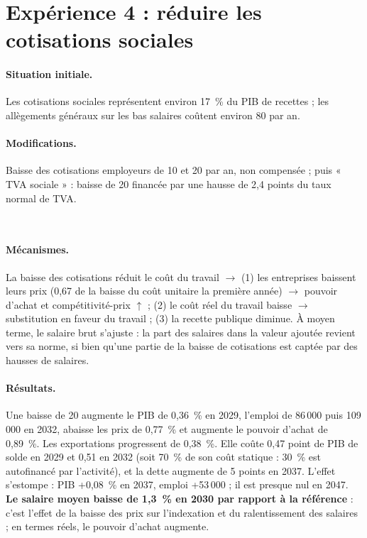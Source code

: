 \section{Expérience 4 : réduire les cotisations sociales}
\label{sec:exp4}

\paragraph{Situation initiale.} Les cotisations sociales représentent environ 17~\% du PIB de recettes ; les allègements
généraux sur les bas salaires coûtent environ 80\md{} par an.

\paragraph{Modifications.} Baisse des cotisations employeurs de 10\md{} et 20\md{} par an, non compensée ; puis
« TVA sociale » : baisse de 20\md{} financée par une hausse de 2,4 points du taux normal de TVA.

\begin{table}[htbp]
\centering\scriptsize
\caption{Expérience 4 — Baisse des cotisations employeurs.}
\label{tab:cotisations}
\\[4pt]
\end{table}

\paragraph{Mécanismes.} La baisse des cotisations réduit le coût du travail $\to$ (1) les entreprises baissent leurs
prix (0,67 de la baisse du coût unitaire la première année) $\to$ pouvoir d'achat et compétitivité-prix
$\uparrow$ ; (2) le coût réel du travail baisse $\to$ substitution en faveur du travail ; (3) la recette publique
diminue. À moyen terme, le salaire brut s'ajuste : la part des salaires dans la valeur ajoutée revient vers sa norme,
si bien qu'une partie de la baisse de cotisations est captée par des hausses de salaires.

\paragraph{Résultats.} Une baisse de 20\md{} augmente le PIB de 0,36~\% en 2029, l'emploi de 86\,000 puis 109\,000 en
2032, abaisse les prix de 0,77~\% et augmente le pouvoir d'achat de 0,89~\%. Les exportations progressent de 0,38~\%.
Elle coûte 0,47 point de PIB de solde en 2029 et 0,51 en 2032 (soit 70~\% de son coût statique : 30~\% est
autofinancé par l'activité), et la dette augmente de 5 points en 2037. L'effet s'estompe : PIB +0,08~\% en 2037,
emploi +53\,000 ; il est presque nul en 2047. \textbf{Le salaire moyen baisse de 1,3~\% en 2030 par rapport à la
référence} : c'est l'effet de la baisse des prix sur l'indexation et du ralentissement des salaires ; en termes
réels, le pouvoir d'achat augmente.

